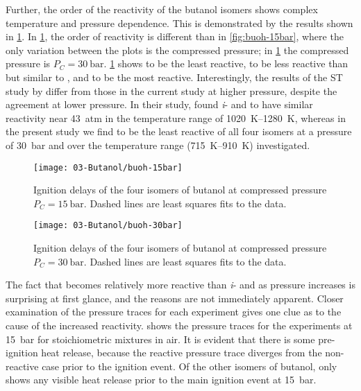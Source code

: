 \documentclass[../main.tex]{subfiles}
\begin{document}
Further, the order of the reactivity of the butanol isomers shows complex
temperature and pressure dependence. This is demonstrated by the results shown
in \cref{fig:buoh-30bar}. In \cref{fig:buoh-30bar}, the order of
reactivity is different than in \cref{fig:buoh-15bar}, where the only
variation between the plots is the compressed pressure; in
\cref{fig:buoh-30bar} the compressed pressure is $P_C=\SI{30}{\bar}$.
\cref{fig:buoh-30bar} shows \iBuOH{} to be the least reactive,
\sBuOH{} to be less reactive than but similar to \tBuOH{},
and \nBuOH{} to be the most reactive. Interestingly, the results of
the ST study by \textcite{Stranic2012} differ from those in the current
study at higher pressure, despite the agreement at lower pressure. In their
study, \textcite{Stranic2012} found \textit{i}- and \nBuOH{} to have
similar reactivity near \SI{43}{atm} in the temperature range of \SIrange{1020}{1280}{\kelvin},
whereas in the present study we find \iBuOH{} to be the least
reactive of all four isomers at a pressure of \SI{30}{\bar} and over the temperature
range (\SIrange{715}{910}{\kelvin}) investigated.

\begin{figure}
    \begin{floatrow}
    \ffigbox
        {\texttt{[image: 03-Butanol/buoh-15bar]}}
        {\caption{Ignition delays of the four isomers of butanol at compressed
            pressure $P_C=\SI{15}{\bar}$. Dashed lines are least squares fits to the
            data.}
        \label{fig:buoh-15bar}}
    \ffigbox
        {\texttt{[image: 03-Butanol/buoh-30bar]}}
        {\caption{Ignition delays of the four isomers of butanol at compressed
            pressure $P_C=\SI{30}{\bar}$. Dashed lines are least squares fits to the
            data.}
        \label{fig:buoh-30bar}}
    \end{floatrow}
\end{figure}

The fact that \tBuOH{} becomes relatively more reactive than
\textit{i}- and \sBuOH{} as pressure increases is surprising at first
glance, and the reasons are not immediately apparent. Closer examination of the
pressure traces for each experiment gives one clue as to the cause of the
increased reactivity.  shows the pressure traces for
the \tBuOH{} experiments at \SI{15}{\bar} for stoichiometric mixtures in
air. It is evident that there is some pre-ignition heat release, because the
reactive pressure trace diverges from the non-reactive case prior to the
ignition event. Of the other isomers of butanol, only \nBuOH{} shows
any visible heat release prior to the main ignition event at \SI{15}{\bar}.
\end{document}
